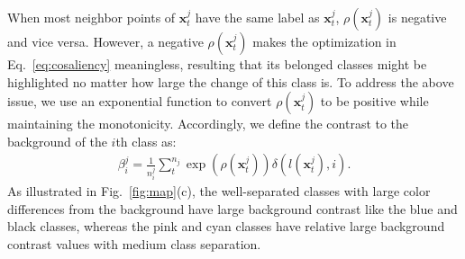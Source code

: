 When most neighbor points of $\mathbf{x}^j_t$ have the same label as $\mathbf{x}^j_t$,  $\rho (\mathbf{x}^j_t)$ is negative and vice versa.
However, a negative $\rho (\mathbf{x}^j_t)$ makes the optimization in Eq.~\ref{eq:cosaliency} meaningless, resulting that its belonged classes might be highlighted no matter how large the change of this class is.
To address the above issue, we use an exponential function to convert $\rho (\mathbf{x}^j_t)$ to be positive while maintaining the monotonicity. Accordingly, we define
the contrast to the background of the $i$th class as:
\begin{align}\label{eq:ctbc}
 \beta^j_i = \frac{1}{n^j_i}\sum^{n_j}_{t} \exp(\rho(\mathbf{x}^j_t)) \delta(l(\mathbf{x}^j_t),i).
\end{align}
As illustrated in Fig.~\ref{fig:map}(c), the well-separated classes with large color differences from the background have large background contrast like the blue and black classes, whereas the pink and cyan classes have  relative large background contrast values with medium class separation.




